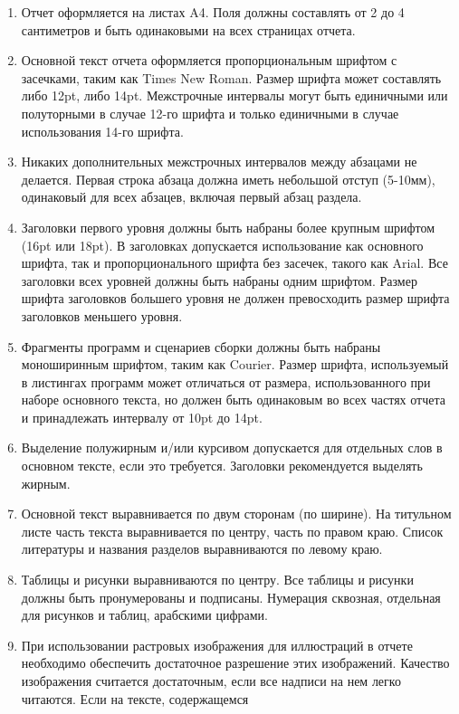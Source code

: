 \documentclass[a4paper,12pt,titlepage,final]{article}
\begin{document}
\begin{enumerate}
\item Отчет оформляется на листах A4. Поля должны составлять от 2 до 4
    сантиметров и быть одинаковыми на всех страницах отчета.
\item Основной текст отчета оформляется пропорциональным шрифтом с засечками,
    таким как Times New Roman. Размер шрифта может составлять либо 12pt, либо 14pt.
    Межстрочные интервалы могут быть единичными или полуторными в случае 12-го шрифта
    и только единичными в случае использования 14-го шрифта.
\item Никаких дополнительных межстрочных интервалов между абзацами не делается.
    Первая строка абзаца должна иметь небольшой отступ (5-10мм), одинаковый для
    всех абзацев, включая первый абзац раздела.
\item Заголовки первого уровня должны быть набраны более крупным шрифтом (16pt или 18pt).
    В заголовках допускается использование как основного шрифта, так и пропорционального
    шрифта без засечек, такого как Arial. Все заголовки всех уровней должны быть набраны
    одним шрифтом. Размер шрифта заголовков большего уровня не должен превосходить размер
    шрифта заголовков меньшего уровня.
\item Фрагменты программ и сценариев сборки должны быть набраны моноширинным шрифтом, таким
    как Courier. Размер шрифта, используемый в листингах программ может отличаться от размера,
    использованного при наборе основного текста, но должен быть одинаковым во всех частях
    отчета и принадлежать интервалу от 10pt до 14pt.
\item Выделение полужирным и/или курсивом допускается для отдельных слов в основном тексте,
    если это требуется. Заголовки рекомендуется выделять жирным.
\item Основной текст выравнивается по двум сторонам (по ширине). На титульном листе часть текста
    выравнивается по центру, часть по правом краю. Список литературы и названия разделов 
    выравниваются по левому краю.
\item Таблицы и рисунки выравниваются по центру. Все таблицы и рисунки должны быть пронумерованы
    и подписаны. Нумерация сквозная, отдельная для рисунков и таблиц, арабскими цифрами.
\item При использовании растровых изображения для иллюстраций в отчете
    необходимо обеспечить достаточное разрешение этих изображений. Качество изображения
    считается достаточным, если все надписи на нем легко читаются. Если на тексте, содержащемся

\end{enumerate}
\end{document}
